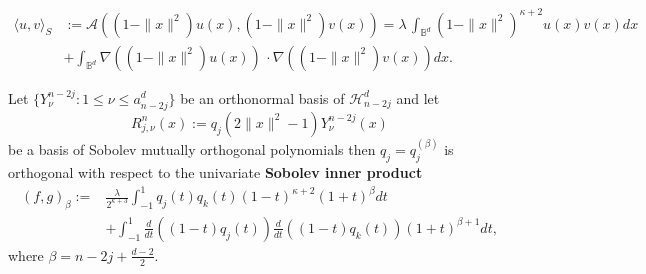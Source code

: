 \documentclass[10pt,a4paper]{amsart}
\begin{document}
\begin{align} 
\langle  u, v\rangle_{S} &:= \mathcal{A} \left((1-\|x\|^2) u(x), (1-\|x\|^2)v(x)\right) =  \lambda\, \int_{{\mathbb B}^{d}} (1-\|x\|^2)^{\kappa+2} u(x) v(x) dx \nonumber  \\ 
  &+ \int_{{\mathbb B}^{d}} \nabla ((1-\|x\|^2)u(x))\,\cdot \nabla ((1-\|x\|^2)v(x)) dx. \label{Sob_ip}
\end{align}

\begin{prop} \label{prop-3.1}
Let $\{Y_\nu^{n-2j}: 1 \le \nu \le a_{n-2j}^d\}$ be an orthonormal basis of $\mathcal{H}_{n-2j}^d$ and let
\[
R_{j,\nu}^{n}(x) := q_{j}(2 \|x\|^2 -1) Y_\nu^{n-2j}(x)
\]
be a basis of Sobolev mutually orthogonal polynomials then $q_{j} = q_{j}^{(\beta)}$ is orthogonal with respect to the univariate \textbf{Sobolev inner product} 
\begin{align}
    (f,g)_{\beta} := & \frac{\lambda}{2^{\kappa+3}} \int_{-1}^1 q_{j}(t) q_{k}(t) (1-t)^{\kappa + 2} (1+t)^{\beta} dt \nonumber\\
 & +    \int_{-1}^1 \frac{d}{dt}\left((1-t)q_j(t)\right) \frac{d}{dt}\left((1-t)q_k(t)\right) (1+t)^{\beta+1} dt, \label{sob_ip_beta} 
\end{align}
where \(\beta = n -2j + \frac{d-2}{2}\). 
\end{prop}
\end{document}
